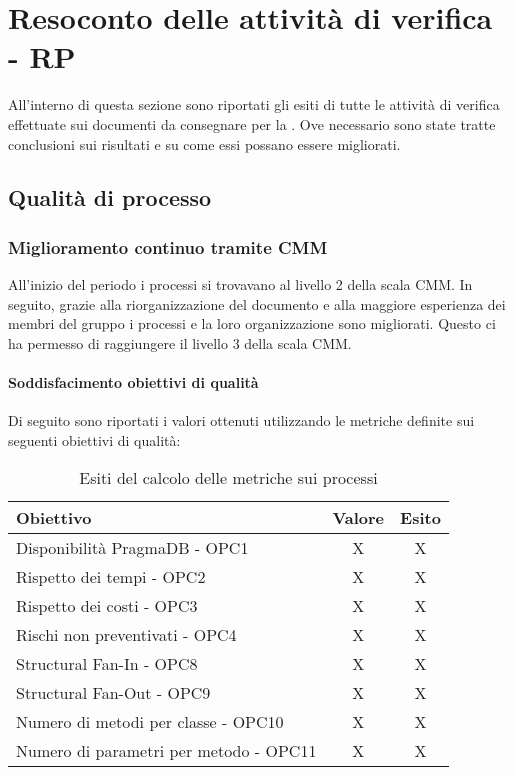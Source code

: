 \documentclass[PdQ.tex]{subfiles}
\begin{document}
\section{Resoconto delle attività di verifica - RP}
All'interno di questa sezione sono riportati gli esiti di tutte le attività di verifica effettuate sui documenti da consegnare per la \RP{}. Ove necessario sono state tratte conclusioni sui risultati e su come essi possano essere migliorati.

\subsection{Qualità di processo}
		\subsubsection{Miglioramento continuo tramite CMM}
	
		All'inizio del periodo i processi si trovavano al livello 2 della scala CMM. In seguito, grazie alla riorganizzazione del documento \NPdocRP{} e alla maggiore esperienza dei membri del gruppo i processi e la loro organizzazione sono migliorati. Questo ci ha permesso di raggiungere il livello 3 della scala CMM. 

		\paragraph{Soddisfacimento obiettivi di qualità}
			Di seguito sono riportati i valori ottenuti utilizzando le metriche definite sui seguenti obiettivi di qualità:
			\begin{table}[h]
				\centering
				\begin{tabular}{l c c}
					\hline
					\rule[-0.3cm]{0cm}{0.8cm}
					\textbf{Obiettivo} & \textbf{Valore} & \textbf{Esito} \\
					\hline
					\rule[0cm]{0cm}{0.4cm}
					Disponibilità PragmaDB - OPC1 & X & X \\
					\rule[0cm]{0cm}{0.4cm}
					Rispetto dei tempi - OPC2 & X & X \\
					\rule[0cm]{0cm}{0.4cm}
					Rispetto dei costi - OPC3 & X & X\\ 
					\rule[0cm]{0cm}{0.4cm}
					Rischi non preventivati - OPC4 & X & X\\ 
					\rule[0cm]{0cm}{0.4cm}
					Structural Fan-In - OPC8 & X & X\\ 
					\rule[0cm]{0cm}{0.4cm}
					Structural Fan-Out - OPC9 & X & X\\ 
					\rule[0cm]{0cm}{0.4cm}
					Numero di metodi per classe - OPC10 & X & X\\ 
					\rule[0cm]{0cm}{0.4cm}
					Numero di parametri per metodo - OPC11 & X & X\\ 
					\hline
				\end{tabular}
				\caption{Esiti del calcolo delle metriche sui processi}
			\end{table}
		
\end{document}
